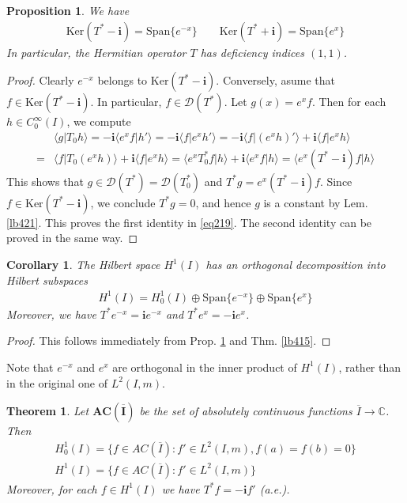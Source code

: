 \documentclass[12pt,b5paper,notitlepage]{article}
\theoremstyle{definition}
\theoremstyle{plain}
\newtheorem{thm}[df]{Theorem}
\newtheorem{pp}[df]{Proposition}
\newtheorem{co}[df]{Corollary}
\newcommand{\ovl}{\overline}
\newcommand{\Dom}{\mathscr{D}}
\newcommand{\Span}{\mathrm{Span}}
\newcommand{\bk}[1]{\langle {#1}\rangle}
\newcommand{\im}{\mathbf{i}}
\newcommand{\Cbb}{\mathbb C}
\newcommand{\Ker}{\mathrm{Ker}}
\numberwithin{equation}{section}
\begin{document}
\begin{pp}\label{lb422}
We have
\begin{align}\label{eq219}
\Ker(T^*-\im)=\Span\{e^{-x}\}\qquad \Ker(T^*+\im)=\Span\{e^{x}\}
\end{align}
In particular, the Hermitian operator $T$ has deficiency indices $(1,1)$.
\end{pp}

\begin{proof}
Clearly $e^{-x}$ belongs to $\Ker(T^*-\im)$. Conversely, asume that $f\in\Ker(T^*-\im)$. In particular, $f\in\Dom(T^*)$. Let $g(x)=e^xf$. Then for each $h\in C_0^\infty(I)$, we compute
\begin{align*}
&\bk{g|T_0h}=-\im\bk{e^xf|h'}=-\im\bk{f|e^xh'}=-\im\bk{f|(e^xh)'}+\im\bk{f|e^xh}\\
=&\bk{f|T_0(e^xh)}+\im\bk{f|e^xh}=\bk{e^xT_0^*f|h}+\im\bk{e^xf|h}=\bk{e^x(T^*-\im)f|h}
\end{align*}
This shows that $g\in\Dom(T^*)=\Dom(T_0^*)$ and $T^*g=e^x(T^*-\im)f$. Since $f\in\Ker(T^*-\im)$, we conclude $T^*g=0$, and hence $g$ is a constant by Lem. \ref{lb421}. This proves the first identity in \eqref{eq219}. The second identity can be proved in the same way.
\end{proof}


\begin{co}\label{lb423}
The Hilbert space $H^1(I)$ has an orthogonal decomposition into Hilbert subspaces
\begin{align}\label{eq220}
H^1(I)=H^1_0(I)\oplus \Span\{e^{-x}\}\oplus \Span\{e^x\}
\end{align}
Moreover, we have $T^*e^{-x}=\im e^{-x}$ and $T^*e^x=-\im e^x$.
\end{co}



\begin{proof}
This follows immediately from Prop. \ref{lb422} and Thm. \ref{lb415}. 
\end{proof}

Note that $e^{-x}$ and $e^x$ are orthogonal in the inner product of $H^1(I)$, rather than in the original one of $L^2(I,m)$.




\begin{thm}\label{lb463}
Let $\pmb{AC(\ovl I)}$  be the set of absolutely continuous functions $\ovl I\rightarrow\Cbb$. Then
\begin{subequations}\label{eq222}
\begin{gather}
H^1_0(I)=\{f\in AC(\ovl I):f'\in L^2(I,m),f(a)=f(b)=0\}\label{eq222a}\\
H^1(I)=\{f\in AC(\ovl I):f'\in L^2(I,m)\}\label{eq222b}
\end{gather} 
\end{subequations}
Moreover, for each $f\in H^1(I)$ we have $T^*f=-\im f'$ (a.e.).
\end{thm}
\end{document}
